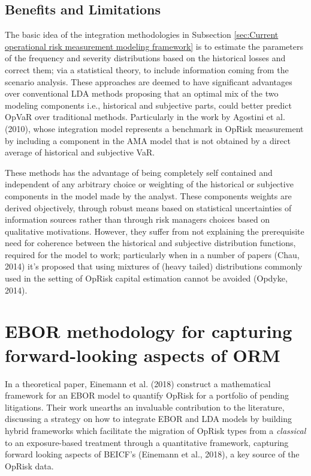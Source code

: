 \documentclass{DissertateUSU}
\begin{document}
\subsection{Benefits and Limitations}
\label{ssec:Benefits and Limitations}

The basic idea of the integration methodologies in Subsection
\ref{sec:Current operational risk measurement modeling framework} is to
estimate the parameters of the frequency and severity distributions
based on the historical losses and correct them; via a statistical
theory, to include information coming from the scenario analysis. These
approaches are deemed to have significant advantages over conventional
LDA methods proposing that an optimal mix of the two modeling components
i.e., historical and subjective parts, could better predict OpVaR over
traditional methods. Particularly in the work by Agostini et al. (2010),
whose integration model represents a benchmark in OpRisk measurement by
including a component in the AMA model that is not obtained by a direct
average of historical and subjective VaR.\medskip

These methods has the advantage of being completely self contained and
independent of any arbitrary choice or weighting of the historical or
subjective components in the model made by the analyst. These components
weights are derived objectively, through robust means based on
statistical uncertainties of information sources rather than through
risk managers choices based on qualitative motivations. However, they
suffer from not explaining the prerequisite need for coherence between
the historical and subjective distribution functions, required for the
model to work; particularly when in a number of papers (Chau, 2014) it's
proposed that using mixtures of (heavy tailed) distributions commonly
used in the setting of OpRisk capital estimation cannot be avoided
(Opdyke, 2014).\medskip

\section{EBOR methodology for capturing forward-looking aspects of ORM}
\label{sec:EBOR methodology for capturing forward-looking aspects of ORM}

In a theoretical paper, Einemann et al. (2018) construct a mathematical
framework for an EBOR model to quantify OpRisk for a portfolio of
pending litigations. Their work unearths an invaluable contribution to
the literature, discussing a strategy on how to integrate EBOR and LDA
models by building hybrid frameworks which facilitate the migration of
OpRisk types from a \emph{classical} to an exposure-based treatment
through a quantitative framework, capturing forward looking aspects of
BEICF's (Einemann et al., 2018), a key source of the OpRisk
data.\medskip
\end{document}
